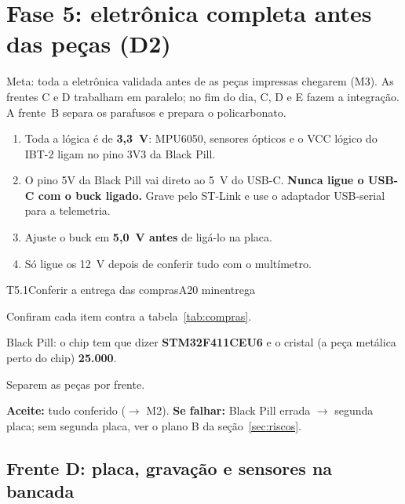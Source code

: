 \documentclass[11pt,a4paper]{article}
\newcommand{\flecha}{\ensuremath{\rightarrow}}
\begin{document}
\section{Fase 5: eletrônica completa antes das peças (D2)}
\label{sec:fase5}

Meta: toda a eletrônica validada antes de as peças impressas chegarem (M3). As frentes C e
D trabalham em paralelo; no fim do dia, C, D e E fazem a integração. A frente~B separa os
parafusos e prepara o policarbonato.

\begin{atencao}
\begin{enumerate}[leftmargin=1.5em]
  \item Toda a lógica é de \textbf{3,3~V}: MPU6050, sensores ópticos e o VCC lógico do IBT-2
    ligam no pino 3V3 da Black Pill.
  \item O pino 5V da Black Pill vai direto ao 5~V do USB-C. \textbf{Nunca ligue o USB-C com
    o buck ligado.} Grave pelo ST-Link e use o adaptador USB-serial para a telemetria.
  \item Ajuste o buck em \textbf{5,0~V antes} de ligá-lo na placa.
  \item Só ligue os 12~V depois de conferir tudo com o multímetro.
\end{enumerate}
\end{atencao}

\begin{tarefa}{T5.1}{Conferir a entrega das compras}{A}{20 min}{entrega}
\begin{passos}
  \item Confiram cada item contra a tabela~\ref{tab:compras}.
  \item Black Pill: o chip tem que dizer \textbf{STM32F411CEU6} e o cristal (a peça metálica
    perto do chip) \textbf{25.000}.
  \item Separem as peças por frente.
\end{passos}
\textbf{Aceite:} tudo conferido (\flecha{} M2).\quad
\textbf{Se falhar:} Black Pill errada \flecha{} segunda placa; sem segunda placa, ver o plano B
da seção~\ref{sec:riscos}.
\end{tarefa}

\subsection{Frente D: placa, gravação e sensores na bancada}
\end{document}
